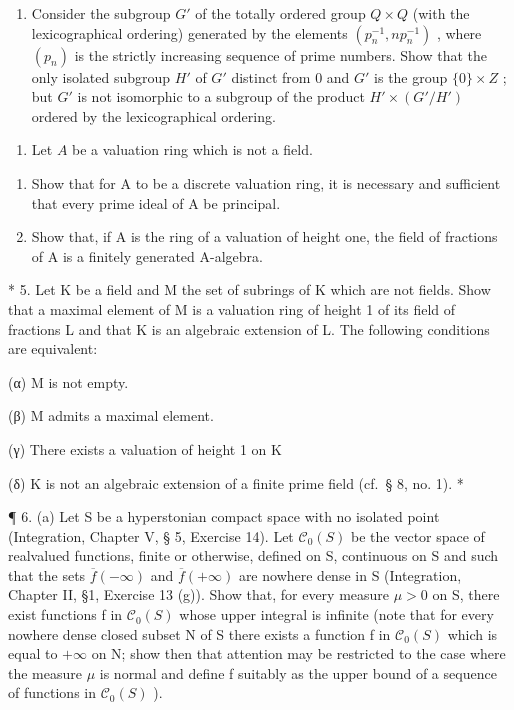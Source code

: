 \begin{enumerate}
\def\labelenumi{(\alph{enumi})}
\setcounter{enumi}{1}
\tightlist
\item
  Consider the subgroup \(G'\) of the totally ordered group \(Q \times Q\) (with the lexicographical ordering) generated by the elements \((p_{n}^{-1}, np_{n}^{-1})\) , where \((p_{n})\) is the strictly increasing sequence of prime numbers. Show that the only isolated subgroup \(H'\) of \(G'\) distinct from 0 and \(G'\) is the group \(\{0\} \times Z\) ; but \(G'\) is not isomorphic to a subgroup of the product \(H' \times (G'/H')\) ordered by the lexicographical ordering.
\end{enumerate}

\begin{enumerate}
\def\labelenumi{\arabic{enumi}.}
\setcounter{enumi}{3}
\tightlist
\item
  Let \(A\) be a valuation ring which is not a field.
\end{enumerate}

\begin{enumerate}
\def\labelenumi{(\alph{enumi})}
\item
  Show that for A to be a discrete valuation ring, it is necessary and sufficient that every prime ideal of A be principal.
\item
  Show that, if A is the ring of a valuation of height one, the field of fractions of A is a finitely generated A-algebra.
\end{enumerate}

* 5. Let K be a field and M the set of subrings of K which are not fields. Show that a maximal element of M is a valuation ring of height 1 of its field of fractions L and that K is an algebraic extension of L. The following conditions are equivalent:

(α) M is not empty.

(β) M admits a maximal element.

(γ) There exists a valuation of height 1 on K

(δ) K is not an algebraic extension of a finite prime field (cf.~§ 8, no. 1). *

¶ 6. (a) Let S be a hyperstonian compact space with no isolated point (Integration, Chapter V, § 5, Exercise 14). Let \(\mathcal{C}_{0}(S)\) be the vector space of realvalued functions, finite or otherwise, defined on S, continuous on S and such that the sets \(\overline{f}(-\infty)\) and \(\overline{f}(+\infty)\) are nowhere dense in S (Integration, Chapter II, §1, Exercise 13 (g)). Show that, for every measure \(\mu > 0\) on S, there exist functions f in \(\mathcal{C}_{0}(S)\) whose upper integral is infinite (note that for every nowhere dense closed subset N of S there exists a function f in \(\mathcal{C}_{0}(S)\) which is equal to \(+\infty\) on N; show then that attention may be restricted to the case where the measure \(\mu\) is normal and define f suitably as the upper bound of a sequence of functions in \(\mathcal{C}_{0}(S)\) ).


